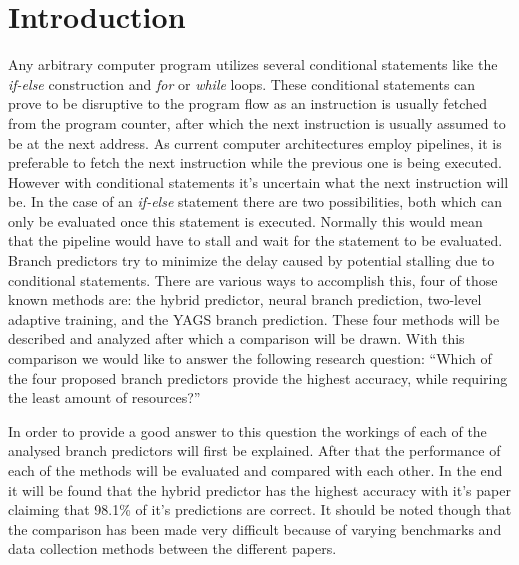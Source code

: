 \section{Introduction}

Any arbitrary computer program utilizes several conditional statements like the \textit{if-else} construction and \textit{for} or \textit{while} loops.
These conditional statements can prove to be disruptive to the program flow as an instruction is usually fetched from the program counter, after which the next instruction is usually assumed to be at the next address.
As current computer architectures employ pipelines, it is preferable to fetch the next instruction while the previous one is being executed.
However with conditional statements it's uncertain what the next instruction will be.
In the case of an \textit{if-else} statement there are two possibilities, both which can only be evaluated once this statement is executed.
Normally this would mean that the pipeline would have to stall and wait for the statement to be evaluated.
Branch predictors try to minimize the delay caused by potential stalling due to conditional statements.
There are various ways to accomplish this, four of those known methods are: the hybrid predictor, neural branch prediction, two-level adaptive training, and the YAGS branch prediction.
These four methods will be described and analyzed after which a comparison will be drawn.
With this comparison we would like to answer the following research question:
\enquote{Which of the four proposed branch predictors provide the highest accuracy, while requiring the least amount of resources?}

In order to provide a good answer to this question the workings of each of the analysed branch predictors will first be explained. 
After that the performance of each of the methods will be evaluated and compared with each other. 
In the end it will be found that the hybrid predictor has the highest accuracy with it's paper claiming that 98.1\% of it's predictions are correct. 
It should be noted though that the comparison has been made very difficult because of varying benchmarks and data collection methods between the different papers.
